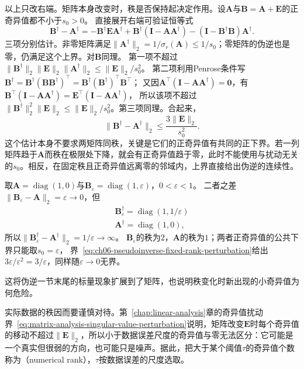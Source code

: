 以上只改右端。矩阵本身改变时，秩是否保持起决定作用。设$\bm A$与$\bm B=\bm A+\bm E$的正奇异值都不小于$s_0>0$。
直接展开右端可验证恒等式
\[
 \bm B^\dagger-\bm A^\dagger
 =-\bm B^\dagger\bm E\bm A^\dagger
 +\bm B^\dagger(\bm I-\bm A\bm A^\dagger)
 -(\bm I-\bm B^\dagger\bm B)\bm A^\dagger .
\]
三项分别估计。非零矩阵满足$\lVert\bm A^\dagger\rVert_2=1/\sigma_r(\bm A)\leq1/s_0$；零矩阵的伪逆也是零，仍满足这个上界。对$\bm B$同理。
第一项不超过$\lVert\bm B^\dagger\rVert_2\lVert\bm E\rVert_2\lVert\bm A^\dagger\rVert_2\leq\lVert\bm E\rVert_2/s_0^2$。
第二项利用Penrose条件写$\bm B^\dagger=\bm B^\dagger(\bm B\bm B^\dagger)^\top=\bm B^\dagger(\bm B^\dagger)^\top\bm B^\top$；
又因$\bm A^\top(\bm I-\bm A\bm A^\dagger)=\bm0$，有$\bm B^\top(\bm I-\bm A\bm A^\dagger)=\bm E^\top(\bm I-\bm A\bm A^\dagger)$，
所以该项不超过$\lVert\bm B^\dagger\rVert_2^2\lVert\bm E\rVert_2\leq\lVert\bm E\rVert_2/s_0^2$。第三项同理。合起来，
\begin{equation}
 \lVert\bm B^\dagger-\bm A^\dagger\rVert_2
 \leq\frac{3\lVert\bm E\rVert_2}{s_0^2}.
 \label{eq:ch06-pseudoinverse-fixed-rank-perturbation}
\end{equation}
这个估计本身不要求两矩阵同秩，关键是它们的正奇异值有共同的正下界。若一列矩阵趋于$\bm A$而秩在极限处下降，就会有正奇异值趋于零，此时不能使用与扰动无关的$s_0$。相反，在固定秩且正奇异值远离零的邻域内，上界直接给出伪逆的连续性。

\begin{example}[反例：秩改变时伪逆不连续]
\label{ex:ls-pinv-discontinuity}
取$\bm A=\operatorname{diag}(1,0)$与$\bm B_\varepsilon=\operatorname{diag}(1,\varepsilon)$，$0<\varepsilon<1$。
二者之差$\lVert\bm B_\varepsilon-\bm A\rVert_2=\varepsilon\to0$，但
\[
 \begin{gathered}
\bm B_\varepsilon^\dagger=\operatorname{diag}(1,1/\varepsilon)\\
\bm A^\dagger=\operatorname{diag}(1,0),
 \end{gathered}
\]
所以$\lVert\bm B_\varepsilon^\dagger-\bm A^\dagger\rVert_2=1/\varepsilon\to\infty$。
$\bm B_\varepsilon$的秩为$2$，$\bm A$的秩为$1$；两者正奇异值的公共下界只能取$s_0=\varepsilon$，
界~\eqref{eq:ch06-pseudoinverse-fixed-rank-perturbation}给出$3\varepsilon/\varepsilon^2=3/\varepsilon$，同样随$\varepsilon\to0$无界。
\end{example}

这将伪逆一节末尾的标量现象扩展到了矩阵，也说明秩变化时新出现的小奇异值为何危险。

实际数据的秩因而要谨慎对待。第~\ref{chap:linear-analysis}章的奇异值扰动界~\eqref{eq:matrix-analysis-singular-value-perturbation}说明，矩阵改变$\bm E$时每个奇异值的移动不超过$\lVert\bm E\rVert_2$，所以小于数据误差尺度的奇异值与零无法区分：它可能是一个真实但很弱的方向，也可能只是噪声。据此，把大于某个阈值$\tau$的奇异值个数称为（numerical rank），$\tau$按数据误差的尺度选取。

